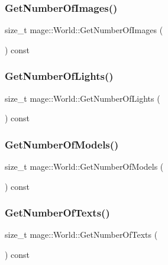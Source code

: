 \subsubsection{\texorpdfstring{Get\+Number\+Of\+Images()}{GetNumberOfImages()}}
{\footnotesize\ttfamily size\+\_\+t mage\+::\+World\+::\+Get\+Number\+Of\+Images (\begin{DoxyParamCaption}{ }\end{DoxyParamCaption}) const}

\hypertarget{classmage_1_1_world_a786420d8d8b97065ee591753b7f1541b}{}\label{classmage_1_1_world_a786420d8d8b97065ee591753b7f1541b} 
\subsubsection{\texorpdfstring{Get\+Number\+Of\+Lights()}{GetNumberOfLights()}}
{\footnotesize\ttfamily size\+\_\+t mage\+::\+World\+::\+Get\+Number\+Of\+Lights (\begin{DoxyParamCaption}{ }\end{DoxyParamCaption}) const}

\hypertarget{classmage_1_1_world_a6e04fdde74a2616746cdafd12537c4a7}{}\label{classmage_1_1_world_a6e04fdde74a2616746cdafd12537c4a7} 
\subsubsection{\texorpdfstring{Get\+Number\+Of\+Models()}{GetNumberOfModels()}}
{\footnotesize\ttfamily size\+\_\+t mage\+::\+World\+::\+Get\+Number\+Of\+Models (\begin{DoxyParamCaption}{ }\end{DoxyParamCaption}) const}

\hypertarget{classmage_1_1_world_af905e4f753a0cb397425f2dc40256e52}{}\label{classmage_1_1_world_af905e4f753a0cb397425f2dc40256e52} 
\subsubsection{\texorpdfstring{Get\+Number\+Of\+Texts()}{GetNumberOfTexts()}}
{\footnotesize\ttfamily size\+\_\+t mage\+::\+World\+::\+Get\+Number\+Of\+Texts (\begin{DoxyParamCaption}{ }\end{DoxyParamCaption}) const}

